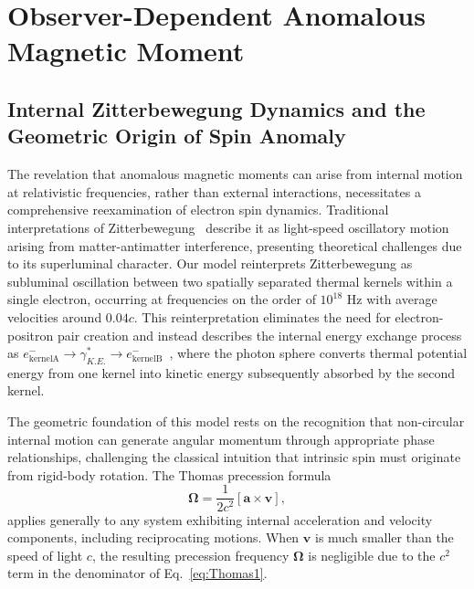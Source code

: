 \documentclass[%
 reprint,
 amsmath,amssymb,
 aps,
]{revtex4-1}
\numberwithin{equation}{section}%
\begin{document}
\section{Observer-Dependent Anomalous Magnetic Moment}

\subsection{Internal Zitterbewegung Dynamics and the Geometric Origin of Spin Anomaly}

The revelation that anomalous magnetic moments can arise from internal motion at relativistic frequencies, rather than external interactions, necessitates a comprehensive reexamination of electron spin dynamics. Traditional interpretations of Zitterbewegung~\cite{schrodinger1930,hestenes1990,recami1995} describe it as light-speed oscillatory motion arising from matter-antimatter interference, presenting theoretical challenges due to its superluminal character. Our model reinterprets Zitterbewegung as subluminal oscillation between two spatially separated thermal kernels within a single electron, occurring at frequencies on the order of $10^{18}$ Hz with average velocities around $0.04c$. This reinterpretation eliminates the need for electron-positron pair creation and instead describes the internal energy exchange process as $e^-_{\text{kernelA}} \to \gamma^*_{K.E.} \to e^-_{\text{kernelB}}$~\cite{hanamura2309.0047}, where the photon sphere converts thermal potential energy from one kernel into kinetic energy subsequently absorbed by the second kernel.

The geometric foundation of this model rests on the recognition that non-circular internal motion can generate angular momentum through appropriate phase relationships, challenging the classical intuition that intrinsic spin must originate from rigid-body rotation. The Thomas precession formula~\cite{thomas1926,thomas1927}
\begin{equation}
    \boldsymbol{\Omega} = \frac{1}{2c^2}[\mathbf{a} \times \mathbf{v}],
    \label{eq:Thomas1}
\end{equation}
applies generally to any system exhibiting internal acceleration and velocity components, including reciprocating motions. When $\boldsymbol{v}$ is much smaller than the speed of light $c$, the resulting precession frequency $\boldsymbol{\Omega}$ is negligible due to the $c^2$ term in the denominator of Eq.~\eqref{eq:Thomas1}.
\end{document}
